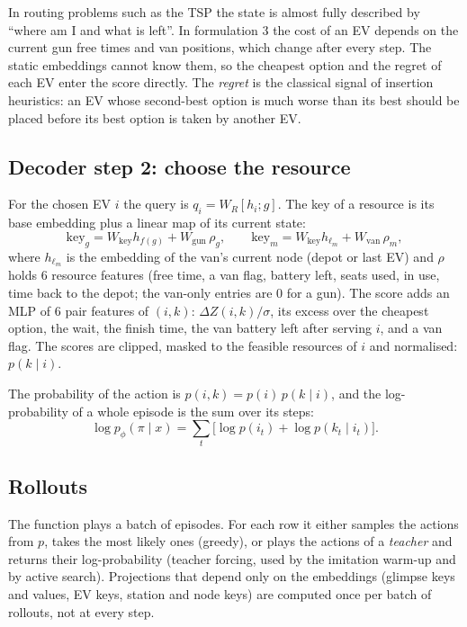 \begin{whybox}[title=Why dynamic features are added to the pointer]
In routing problems such as the TSP the state is almost fully described by ``where am I and what is left''. In formulation 3 the cost of an EV depends on the current gun free times and van positions, which change after every step. The static embeddings cannot know them, so the cheapest option and the regret of each EV enter the score directly. The \emph{regret} is the classical signal of insertion heuristics: an EV whose second-best option is much worse than its best should be placed before its best option is taken by another EV.
\end{whybox}

\subsection{Decoder step 2: choose the resource}

For the chosen EV $i$ the query is $q_i=W_R[h_i;g]$. The key of a resource is its base embedding plus a linear map of its current state:
\[
\text{key}_g=W_{\text{key}}h_{f(g)}+W_{\text{gun}}\,\rho_g,\qquad \text{key}_m=W_{\text{key}}h_{\ell_m}+W_{\text{van}}\,\rho_m,
\]
where $h_{\ell_m}$ is the embedding of the van's current node (depot or last EV) and $\rho$ holds 6 resource features (free time, a van flag, battery left, seats used, in use, time back to the depot; the van-only entries are 0 for a gun). The score adds an MLP of 6 pair features of $(i,k)$: $\Delta Z(i,k)/\sigma$, its excess over the cheapest option, the wait, the finish time, the van battery left after serving $i$, and a van flag. The scores are clipped, masked to the feasible resources of $i$ and normalised: $p(k\mid i)$.

The probability of the action is $p(i,k)=p(i)\,p(k\mid i)$, and the log-probability of a whole episode is the sum over its steps:
\[
\log p_\phi(\pi\mid x)=\sum_t\big[\log p(i_t)+\log p(k_t\mid i_t)\big].
\]

\subsection{Rollouts}

The function  plays a batch of episodes. For each row it either samples the actions from $p$, takes the most likely ones (greedy), or plays the actions of a \emph{teacher} and returns their log-probability (teacher forcing, used by the imitation warm-up and by active search). Projections that depend only on the embeddings (glimpse keys and values, EV keys, station and node keys) are computed once per batch of rollouts, not at every step.
